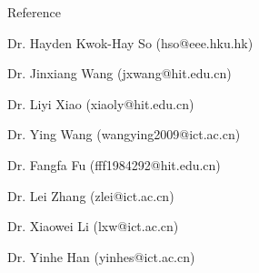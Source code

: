\documentclass{resume} %
\begin{document}
\begin{rSection}{Reference}
\item Dr. Hayden Kwok-Hay So                        (hso@eee.hku.hk)
\item Dr. Jinxiang Wang                             (jxwang@hit.edu.cn)
\item Dr. Liyi Xiao                                 (xiaoly@hit.edu.cn)
\item Dr. Ying Wang                                 (wangying2009@ict.ac.cn)
\item Dr. Fangfa Fu                                 (fff1984292@hit.edu.cn)
\item Dr. Lei Zhang                                 (zlei@ict.ac.cn)
\item Dr. Xiaowei Li                                (lxw@ict.ac.cn)
\item Dr. Yinhe Han                                 (yinhes@ict.ac.cn)
\end{rSection}
\end{document}
